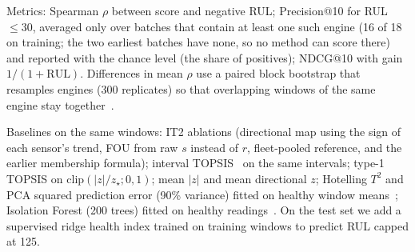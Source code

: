 \documentclass[journal,10pt,twocolumn]{IEEEtran}
\begin{document}
Metrics: Spearman $\rho$ between score and negative RUL; Precision@10 for RUL $\le30$, averaged only over batches that contain at least one such engine (16 of 18 on training; the two earliest batches have none, so no method can score there) and reported with the chance level (the share of positives); NDCG@10 with gain $1/(1+\mathrm{RUL})$. Differences in mean $\rho$ use a paired block bootstrap that resamples engines (300 replicates) so that overlapping windows of the same engine stay together~\cite{efron1993}.

Baselines on the same windows: IT2 ablations (directional map using the sign of each sensor's trend, FOU from raw $s$ instead of $r$, fleet-pooled reference, and the earlier membership formula); interval TOPSIS~\cite{jahanshahloo2006} on the same intervals; type-1 TOPSIS on $\mathrm{clip}(|z|/z_\star;0,1)$; mean $|z|$ and mean directional $z$; Hotelling $T^2$ and PCA squared prediction error (90\% variance) fitted on healthy window means~\cite{macgregor1995}; Isolation Forest (200 trees) fitted on healthy readings~\cite{liu2008iforest}. On the test set we add a supervised ridge health index trained on training windows to predict RUL capped at 125.
\end{document}
